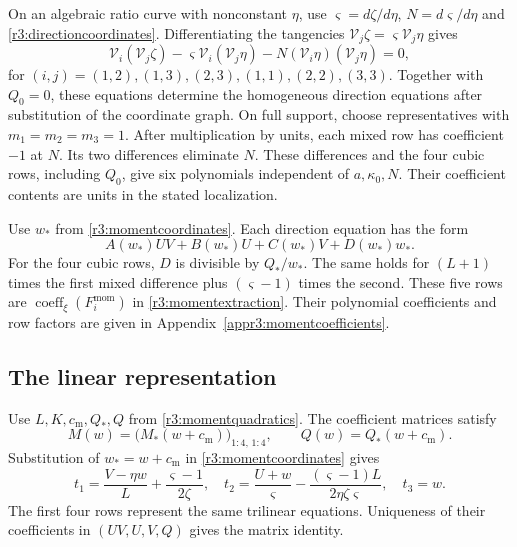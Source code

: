 \documentclass[11pt,a4paper]{article}
\numberwithin{equation}{section}
\theoremstyle{plain}
\theoremstyle{definition}
\theoremstyle{remark}
\begin{document}
On an algebraic ratio curve with nonconstant $\eta$, use
$\varsigma=d\zeta/d\eta$, $N=d\varsigma/d\eta$ and
\eqref{r3:directioncoordinates}.
Differentiating the tangencies
$\mathcal V_j\zeta=\varsigma\mathcal V_j\eta$ gives
\begin{equation}\label{appr3:curvetangencies}
 \mathcal V_i(\mathcal V_j\zeta )
 -\varsigma \mathcal V_i(\mathcal V_j\eta )
 -N(\mathcal V_i\eta )(\mathcal V_j\eta )=0,
\end{equation}
for $(i,j)=(1,2),(1,3),(2,3),(1,1),(2,2),(3,3)$.
Together with $Q_0=0$, these equations determine the homogeneous
direction equations after substitution of the coordinate graph.
On full support, choose representatives with $m_1=m_2=m_3=1$.
After multiplication by units, each mixed row has coefficient $-1$
at $N$. Its two differences eliminate $N$.
These differences and the four cubic rows, including $Q_0$, give
six polynomials independent of $a,\kappa_0,N$.
Their coefficient contents are units in the stated localization.

Use $w_*$ from \eqref{r3:momentcoordinates}.
Each direction equation has the form
\[
 A(w_*)UV+B(w_*)U+C(w_*)V+D(w_*)w_*.
\]
For the four cubic rows, $D$ is divisible by $Q_*/w_*$.
The same holds for $(L+1)$ times the first mixed difference plus
$(\varsigma-1)$ times the second.
These five rows are $\operatorname{coeff}_{\xi}(F_i^{\mathrm{mom}})$ in
\eqref{r3:momentextraction}. Their polynomial coefficients and row
factors are given in Appendix~\ref{appr3:momentcoefficients}.

\subsection{The linear representation}\label{appr3:momentrepresentation}

Use $L,K,c_{\mathrm m},Q_*,Q$ from \eqref{r3:momentquadratics}.
The coefficient matrices satisfy
\[
 M(w)=\bigl(M_*(w+c_{\mathrm m})\bigr)_{1:4,\,1:4},
 \qquad Q(w)=Q_*(w+c_{\mathrm m}).
\]
Substitution of $w_*=w+c_{\mathrm m}$ in \eqref{r3:momentcoordinates} gives
\[
 t_1=\frac{V-\eta w}{L}+\frac{\varsigma -1}{2\zeta },\quad
 t_2=\frac{U+w}{\varsigma }-\frac{(\varsigma -1)L}{2\eta \zeta \varsigma },\quad t_3=w.
\]
The first four rows represent the same trilinear equations.
Uniqueness of their coefficients in $(UV,U,V,Q)$ gives the matrix
identity.
\end{document}
